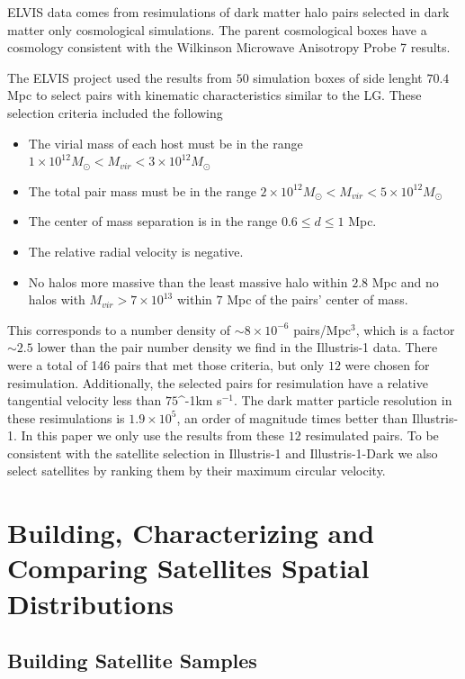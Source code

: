 \documentclass[a4paper,fleqn,usenatbib]{mnras}
\newcommand{\kms}{\ifmmode\mathrm{km\ s}^{-1}\else km s$^{-1}$\fi}
\begin{document}
ELVIS data comes from resimulations of dark matter halo pairs selected
in dark matter only cosmological simulations. 
The parent cosmological boxes have a cosmology consistent with the
Wilkinson Microwave Anisotropy Probe 7 results.

The ELVIS project used the results from $50$ simulation boxes of side
lenght $70.4$ Mpc to select pairs with kinematic characteristics
similar to the LG. 
These selection criteria included the following
\begin{itemize}
\item The virial mass of each host must be in the range 
$1\times
  10^{12} M_{\odot}< M_{vir}<3\times 10^{12}M_{\odot}$ 
\item The total pair mass must be in the range
$2\times
  10^{12} M_{\odot}< M_{vir}<5\times 10^{12}M_{\odot}$ 
\item The center of mass separation is in the range $0.6\leq d\leq1$
  Mpc.
\item The relative radial velocity is negative.
\item No halos more massive than the least massive halo within $2.8$
  Mpc and no halos with $M_{vir}>7\times 10^{13}$ within $7$ Mpc of
  the pairs' center of mass.
\end{itemize} 

This corresponds to a number density of $\sim 8 \times10^{-6}$
pairs/Mpc$^{3}$, which is a factor $\sim 2.5$ lower than the pair
number density we find in the Illustris-1 data.
There were a total of 146 pairs that met those criteria, but only $12$
were chosen for resimulation. 
Additionally, the selected pairs for resimulation have a relative
tangential velocity less than $75 $\kms. 
The dark matter particle resolution in these resimulations is
$1.9\times 10^5$, an order of magnitude times better than Illustris-1.
In this paper we only use the results from these $12$ resimulated pairs.
To be consistent with the satellite selection in Illustris-1 and
Illustris-1-Dark we also select satellites by ranking them by their
maximum circular velocity.


\section{Building, Characterizing and Comparing Satellites Spatial Distributions}
\label{sec:SpatialMeasurements}


\subsection{Building Satellite Samples}
\end{document}
